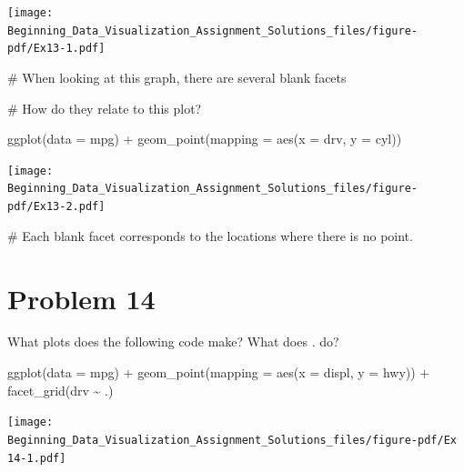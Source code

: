 \documentclass[
  letterpaper,
  DIV=11,
  numbers=noendperiod]{scrreprt}
\newenvironment{Shaded}{\begin{snugshade}}{\end{snugshade}}
\newcommand{\AttributeTok}[1]{\textcolor[rgb]{0.40,0.45,0.13}{#1}}
\newcommand{\CommentTok}[1]{\textcolor[rgb]{0.37,0.37,0.37}{#1}}
\newcommand{\FunctionTok}[1]{\textcolor[rgb]{0.28,0.35,0.67}{#1}}
\newcommand{\NormalTok}[1]{\textcolor[rgb]{0.00,0.23,0.31}{#1}}
\newcommand{\SpecialCharTok}[1]{\textcolor[rgb]{0.37,0.37,0.37}{#1}}
\begin{document}
\texttt{[image: Beginning\_Data\_Visualization\_Assignment\_Solutions\_files/figure-pdf/Ex13-1.pdf]}

\begin{Shaded}
\begin{Highlighting}[]
\CommentTok{\# When looking at this graph, there are several blank facets}

\CommentTok{\# How do they relate to this plot?}

\FunctionTok{ggplot}\NormalTok{(}\AttributeTok{data =}\NormalTok{ mpg) }\SpecialCharTok{+} 
  \FunctionTok{geom\_point}\NormalTok{(}\AttributeTok{mapping =} \FunctionTok{aes}\NormalTok{(}\AttributeTok{x =}\NormalTok{ drv, }\AttributeTok{y =}\NormalTok{ cyl))}
\end{Highlighting}
\end{Shaded}

\texttt{[image: Beginning\_Data\_Visualization\_Assignment\_Solutions\_files/figure-pdf/Ex13-2.pdf]}

\begin{Shaded}
\begin{Highlighting}[]
\CommentTok{\# Each blank facet corresponds to the locations where there is no point.}
\end{Highlighting}
\end{Shaded}

\section*{Problem 14}\label{problem-14-3}


What plots does the following code make? What does . do?

\begin{Shaded}
\begin{Highlighting}[]
\FunctionTok{ggplot}\NormalTok{(}\AttributeTok{data =}\NormalTok{ mpg) }\SpecialCharTok{+} 
  \FunctionTok{geom\_point}\NormalTok{(}\AttributeTok{mapping =} \FunctionTok{aes}\NormalTok{(}\AttributeTok{x =}\NormalTok{ displ, }\AttributeTok{y =}\NormalTok{ hwy)) }\SpecialCharTok{+}
  \FunctionTok{facet\_grid}\NormalTok{(drv }\SpecialCharTok{\textasciitilde{}}\NormalTok{ .)}
\end{Highlighting}
\end{Shaded}

\texttt{[image: Beginning\_Data\_Visualization\_Assignment\_Solutions\_files/figure-pdf/Ex 14-1.pdf]}
\end{document}
